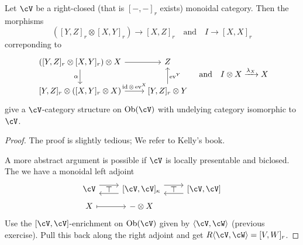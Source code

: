 \documentclass[a4paper,11pt,oneside,openany]{scrbook}
\begin{document}
\begin{prop}
	Let $ \cV $ be a right-closed (that is $ [-,-]_r $ exists) monoidal category.
	Then the morphisms
	\begin{displaymath}
		([Y,Z]_r \otimes [X,Y]_r ) \to [X,Z]_r \quad \text{and} \quad I \to [X,X]_r
	\end{displaymath}
	correponding to
	\begin{displaymath}
		\begin{tikzcd}
			([Y,Z]_r \otimes [X,Y]_r) \otimes X \arrow[r]\arrow[d, "\alpha"'] & Z \\
			\lbrack Y,Z\rbrack_r \otimes ([X,Y]_r \otimes X) \arrow[r, "\id\otimes \ev^X"]  & \lbrack Y,Z\rbrack_r\otimes Y \arrow[u, "\ev^Y"']
		\end{tikzcd}\quad \text{and}\quad
		I\otimes X \xrightarrow{\lambda_X} X
	\end{displaymath}
	give a $ \cV $-category structure on $ \Ob(\cV) $ with undelying category isomorphic to $ \cV $.
\end{prop}
\begin{proof}
	The proof is slightly tedious; We refer to Kelly's book.

	A more abstract argument is possible if $ \cV $ is locally presentable and biclosed.
	The we have a monoidal left adjoint
	\begin{displaymath}
		\begin{tikzcd}[row sep = tiny]
			\cV
			\arrow[r, shift left=.5em] \arrow[from=r, shift left=.5em] \arrow[r,phantom, "\top"]
			& \lbrack \cV,\cV\rbrack_{\kappa}
			\arrow[r, shift left=.5em]
			\arrow[from=r, shift left=.5em]
			\arrow[r,phantom, "\top"]
			& \lbrack \cV ,\cV \rbrack\\
			X \arrow[mapsto, r] & -\otimes X
		\end{tikzcd}
	\end{displaymath}
	Use the $ [\cV,\cV] $-enrichment on $ \Ob(\cV) $ given by $ \langle\cV,\cW\rangle $ (previous exercise).
	Pull this back along the right adjoint and get $ R\langle \cV,\cW\rangle = [V,W]_r $.
\end{proof}
\end{document}
